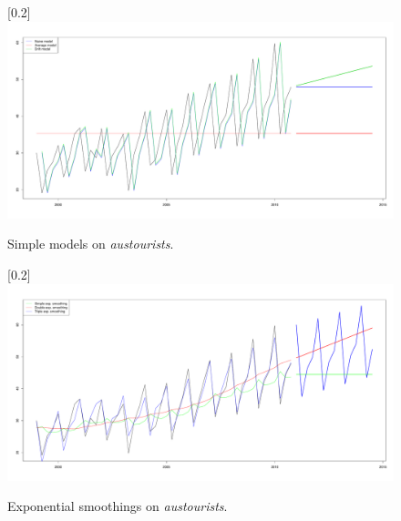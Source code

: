     \begin{figure}[H]
        \begin{center}
            \scalebox{0.25}[0.2]{\includegraphics{img/simple-models.pdf}}
            \caption{Simple models on \emph{austourists}.}
            \label{img:simple-models}
        \end{center}
    \end{figure}

    \begin{figure}[H]
        \begin{center}
            \scalebox{0.25}[0.2]{\includegraphics{img/exp-smoothings.pdf}}
            \caption{Exponential smoothings on \emph{austourists}.}
            \label{img:exp-smoothings}
        \end{center}
    \end{figure}

